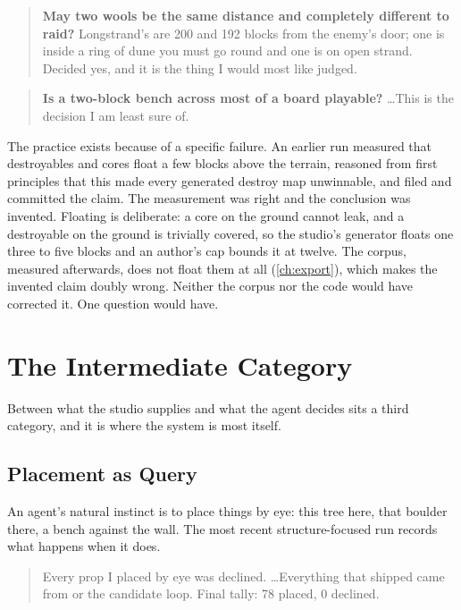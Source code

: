 \begin{quote}
\textbf{May two wools be the same distance and completely different to raid?}
Longstrand's are 200 and 192 blocks from the enemy's door; one is inside a ring of
dune you must go round and one is on open strand. Decided yes, and it is the thing
I would most like judged.
\end{quote}

\begin{quote}
\textbf{Is a two-block bench across most of a board playable?} \ldots This is the
decision I am least sure of.
\end{quote}

The practice exists because of a specific failure. An earlier run measured that
destroyables and cores float a few blocks above the terrain, reasoned from first
principles that this made every generated destroy map unwinnable, and filed and
committed the claim. The measurement was right and the conclusion was invented.
Floating is deliberate: a core on the ground cannot leak, and a destroyable on the
ground is trivially covered, so the studio's generator floats one three to five
blocks and an author's cap bounds it at twelve. The corpus, measured afterwards,
does not float them at all (\cref{ch:export}), which makes the invented claim
doubly wrong.
Neither the corpus nor the code would have corrected it. One question would have.

\section{The Intermediate Category}

Between what the studio supplies and what the agent decides sits a third category,
and it is where the system is most itself.

\subsection{Placement as Query}

An agent's natural instinct is to place things by eye: this tree here, that
boulder there, a bench against the wall. The most recent structure-focused run
records what happens when it does.

\begin{quote}
Every prop I placed by eye was declined. \ldots Everything that shipped came from
 or the candidate loop. Final tally: 78 placed, 0
declined.
\end{quote}

